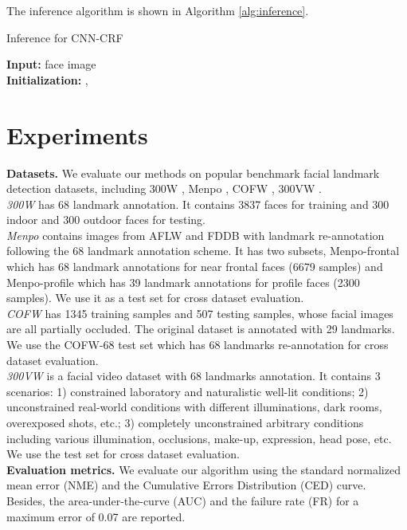 \documentclass{article}
\begin{document}
The inference algorithm is shown in Algorithm \ref{alg:inference}.

\begin{algorithm}[H]
\label{alg:inference}
\SetAlgoLined
\caption{Inference for CNN-CRF}
\textbf{Input:} face image \\
\textbf{Initialization:}  , \;
\end{algorithm}

\section{Experiments} \label{sec:experiments}
\textbf{Datasets.}
We evaluate our methods on popular benchmark facial landmark detection datasets, including 300W \cite{Sagonas16thrW}, Menpo \cite{Zafeiriou17Menpo}, COFW \cite{Burgos-Artizzu13cascade_COFW}, 300VW \cite{thr-VW}.\\
\emph{300W} has 68 landmark annotation. It contains 3837 faces for training and 300 indoor and 300 outdoor faces for testing.\\
\emph{Menpo} contains images from AFLW and FDDB with landmark re-annotation following the 68 landmark annotation scheme. It has two subsets, Menpo-frontal which has 68 landmark annotations for near frontal faces (6679 samples) and Menpo-profile which has 39 landmark annotations for profile faces (2300 samples). We use it as a test set for cross dataset evaluation.\\
\emph{COFW} has 1345 training samples and 507 testing samples, whose facial images are all partially occluded.
The original dataset is annotated with 29 landmarks. 
We use the COFW-68 test set \cite{GhiasiF15COFW68} which has 68 landmarks re-annotation for cross dataset evaluation.\\
\emph{300VW} is a facial video dataset with 68 landmarks annotation. It contains 3 scenarios: 1) constrained laboratory and naturalistic well-lit conditions; 2) unconstrained real-world conditions with different illuminations, dark rooms, overexposed shots, etc.; 3) completely unconstrained arbitrary conditions including various illumination, occlusions, make-up, expression, head pose, etc. We use the test set for cross dataset evaluation.\\
\textbf{Evaluation metrics.} We evaluate our algorithm using the standard normalized mean error (NME) and the Cumulative Errors Distribution (CED) curve. Besides, the area-under-the-curve (AUC) and the failure rate (FR) for a maximum error of 0.07 are reported.
\end{document}

